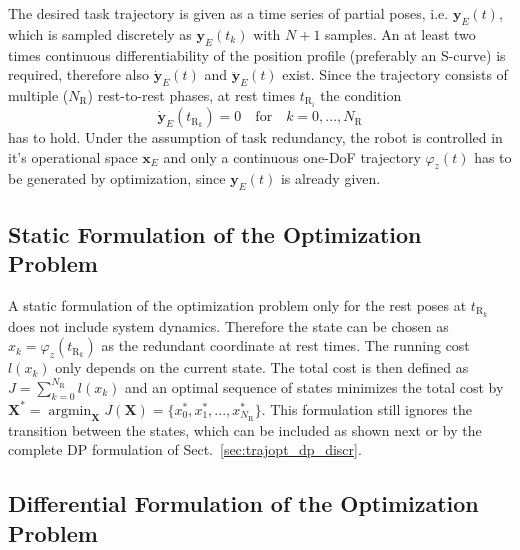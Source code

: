\documentclass[runningheads]{llncs}
\newcommand{\bm}[1]{\boldsymbol{#1}}
\renewcommand{\vec}[1]{\boldsymbol{#1}}
\DeclareMathOperator*{\argmin}{argmin}
\begin{document}
The desired task trajectory is given as a time series of partial poses, i.e. $\vec{y}_E(t)$, which is sampled discretely
as $\vec{y}_E(t_k)$ with $N+1$ samples.
An at least two times continuous differentiability of the position profile (preferably an S-curve) is required, therefore also $\dot{\vec{y}}_E(t)$ and $\ddot{\vec{y}}_E(t)$ exist.
Since the trajectory consists of multiple ($N_\mathrm{R}$) rest-to-rest phases, at rest times $t_{\mathrm{R}_i}$ the condition 
%
\begin{equation}
\dot{\vec{y}}_E(t_{\mathrm{R}_k})=0 
\quad \mathrm{for} \quad
k = 0,...,N_\mathrm{R}
\label{equ:rest_y}
\end{equation}
%
has to hold.
Under the assumption of task redundancy, the robot is controlled in it's operational space $\vec{x}_E$ and only a continuous one-DoF trajectory $\varphi_z(t)$ has to be generated by optimization, since $\vec{y}_E(t)$ is already given.


\subsection{Static Formulation of the Optimization Problem}
\label{sec:problem_static}

A static formulation of the optimization problem only for the rest poses at $t_{\mathrm{R}_k}$ does not include system dynamics. %
Therefore the state can be chosen as $x_k = \varphi_z (t_{\mathrm{R}_k})$ as the redundant coordinate at rest times.
The running cost $l(x_k)$ only depends on the current state.
The total cost is then defined as $J=\sum_{k=0}^{N_\mathrm{R}} l(x_k)$ and an optimal sequence of states minimizes the total cost by $\vec{X}^*=\argmin_{\vec{X}}{J(\vec{X})}=\{x_0^*, x_1^*, ..., x_{N_{\mathrm{R}}}^*\}$.
This formulation still ignores the transition between the states, which can be included as shown next or by the complete DP formulation of Sect.~\ref{sec:trajopt_dp_discr}.


\subsection{Differential Formulation of the Optimization Problem}
\label{sec:problem_differential}
\end{document}
